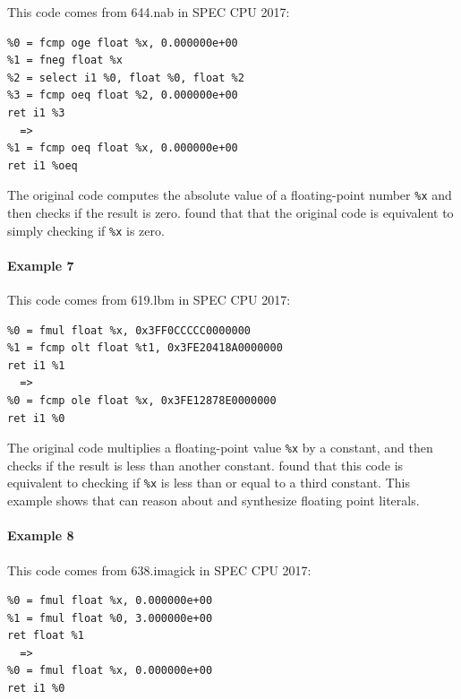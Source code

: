 This code comes from 644.nab in SPEC CPU 2017:

{\begin{quoting}\begin{Verbatim}
%0 = fcmp oge float %x, 0.000000e+00
%1 = fneg float %x
%2 = select i1 %0, float %0, float %2
%3 = fcmp oeq float %2, 0.000000e+00
ret i1 %3
  =>
%1 = fcmp oeq float %x, 0.000000e+00
ret i1 %oeq
\end{Verbatim}
\end{quoting}}

The original code computes the absolute value of a floating-point
number \texttt{\%x} and then checks if the result is zero.
\minotaur{} found that that the original code is equivalent to simply checking if
\texttt{\%x} is zero.


\paragraph*{Example 7}

This code comes from 619.lbm in SPEC CPU 2017:


{\begin{quoting}\begin{Verbatim}
%0 = fmul float %x, 0x3FF0CCCCC0000000
%1 = fcmp olt float %t1, 0x3FE20418A0000000
ret i1 %1
  =>
%0 = fcmp ole float %x, 0x3FE12878E0000000
ret i1 %0
\end{Verbatim}
\end{quoting}}

The original code multiplies a floating-point value \texttt{\%x} by a
constant, and then checks if the result is less than another constant.
\minotaur{} found that this code is equivalent to checking if \texttt{\%x}
is less than or equal to a third constant.
%
This example shows that \minotaur{} can reason about and synthesize floating
point literals.


\paragraph*{Example 8}

This code comes from 638.imagick in SPEC CPU 2017:

{\begin{quoting}\begin{Verbatim}
%0 = fmul float %x, 0.000000e+00
%1 = fmul float %0, 3.000000e+00
ret float %1
  =>
%0 = fmul float %x, 0.000000e+00
ret i1 %0
\end{Verbatim}
\end{quoting}}

